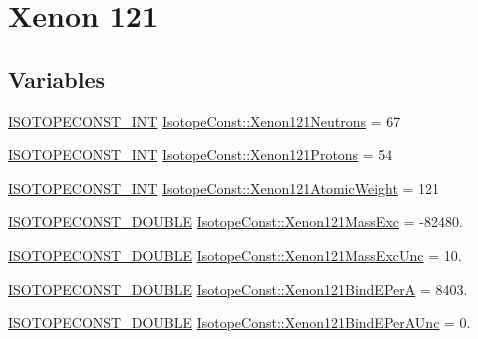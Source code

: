 \hypertarget{group___isotope_const-_xenon-_xe121}{}\section{Xenon 121}
\label{group___isotope_const-_xenon-_xe121}
\subsection*{Variables}
\begin{DoxyCompactItemize}
\item 
\mbox{\hyperlink{group___isotope_const-_macros_ga5f18360b3e99483a35c32d789e62621c}{I\+S\+O\+T\+O\+P\+E\+C\+O\+N\+S\+T\+\_\+\+I\+NT}} \mbox{\hyperlink{group___isotope_const-_xenon-_xe121_ga876a0ae5fa5a1591b247014738e24250}{Isotope\+Const\+::\+Xenon121\+Neutrons}} = 67
\item 
\mbox{\hyperlink{group___isotope_const-_macros_ga5f18360b3e99483a35c32d789e62621c}{I\+S\+O\+T\+O\+P\+E\+C\+O\+N\+S\+T\+\_\+\+I\+NT}} \mbox{\hyperlink{group___isotope_const-_xenon-_xe121_ga3572e05ba00ef93cb297c64bab0331cd}{Isotope\+Const\+::\+Xenon121\+Protons}} = 54
\item 
\mbox{\hyperlink{group___isotope_const-_macros_ga5f18360b3e99483a35c32d789e62621c}{I\+S\+O\+T\+O\+P\+E\+C\+O\+N\+S\+T\+\_\+\+I\+NT}} \mbox{\hyperlink{group___isotope_const-_xenon-_xe121_ga427bae64677e6e6fa2d4120f4153fc8e}{Isotope\+Const\+::\+Xenon121\+Atomic\+Weight}} = 121
\item 
\mbox{\hyperlink{group___isotope_const-_macros_ga8f45a7272ce02c0b4c65c44636ed719a}{I\+S\+O\+T\+O\+P\+E\+C\+O\+N\+S\+T\+\_\+\+D\+O\+U\+B\+LE}} \mbox{\hyperlink{group___isotope_const-_xenon-_xe121_ga6aca32b969569d12082c3255c1f5335f}{Isotope\+Const\+::\+Xenon121\+Mass\+Exc}} = -\/82480.
\item 
\mbox{\hyperlink{group___isotope_const-_macros_ga8f45a7272ce02c0b4c65c44636ed719a}{I\+S\+O\+T\+O\+P\+E\+C\+O\+N\+S\+T\+\_\+\+D\+O\+U\+B\+LE}} \mbox{\hyperlink{group___isotope_const-_xenon-_xe121_gab663f6c80376456394d7940e4a43746e}{Isotope\+Const\+::\+Xenon121\+Mass\+Exc\+Unc}} = 10.
\item 
\mbox{\hyperlink{group___isotope_const-_macros_ga8f45a7272ce02c0b4c65c44636ed719a}{I\+S\+O\+T\+O\+P\+E\+C\+O\+N\+S\+T\+\_\+\+D\+O\+U\+B\+LE}} \mbox{\hyperlink{group___isotope_const-_xenon-_xe121_gad6c02449e96ae6eaca8ccd78c1d245c4}{Isotope\+Const\+::\+Xenon121\+Bind\+E\+PerA}} = 8403.
\item 
\mbox{\hyperlink{group___isotope_const-_macros_ga8f45a7272ce02c0b4c65c44636ed719a}{I\+S\+O\+T\+O\+P\+E\+C\+O\+N\+S\+T\+\_\+\+D\+O\+U\+B\+LE}} \mbox{\hyperlink{group___isotope_const-_xenon-_xe121_ga348999634a215de7b80763e24de18ba5}{Isotope\+Const\+::\+Xenon121\+Bind\+E\+Per\+A\+Unc}} = 0.

\end{DoxyCompactItemize}
